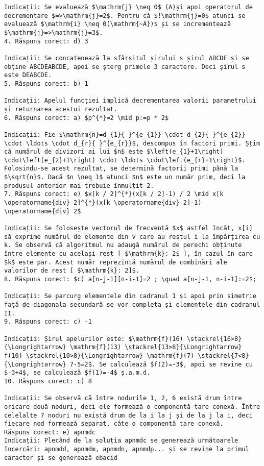 \begin{verbatim}
Indicații: Se evaluează $\mathrm{j} \neq 0$ (A)și apoi operatorul de decrementare $=>\mathrm{j}=2$. Pentru că $!\mathrm{j}=0$ atunci se evaluează $\mathrm{i} \neq 0(\mathrm{~A})$ și se incrementează $\mathrm{j}=>\mathrm{j}=3$.
4. Răspuns corect: d) 3

Indicații: Se concatenează la sfârșitul șirului s șirul ABCDE și se obține ABCDEABCDE, apoi se șterg primele 3 caractere. Deci șirul s este DEABCDE.
5. Răspuns corect: b) 1

Indicații: Apelul funcției implică decrementarea valorii parametrului și returnarea acestui rezultat.
6. Răspuns corect: a) $p^{*}=2 \mid p:=p * 2$

Indicații: Fie $\mathrm{n}=d_{1}{ }^{e_{1}} \cdot d_{2}{ }^{e_{2}} \cdot \ldots \cdot d_{r}{ }^{e_{r}}$, descompus în factori primi. Ș̦tim că numărul de divizori ai lui $n$ este $\left(e_{1}+1\right) \cdot\left(e_{2}+1\right) \cdot \ldots \cdot\left(e_{r}+1\right)$. Folosindu-se acest rezultat, se determină factorii primi până la $\sqrt{n}$. Dacă $n \neq 1$ atunci $n$ este un număr prim, deci la produsul anterior mai trebuie înmulțit 2.
7. Răspuns corect: e) $x[k / 2]^{*}(x[k / 2]-1) / 2 \mid x[k \operatorname{div} 2]^{*}(x[k \operatorname{div} 2]-1) \operatorname{div} 2$

Indicații: Se folosește vectorul de frecvență $x$ astfel încât, x[i] să exprime numărul de elemente din v care au restul i la împărțirea cu k. Se observă că algoritmul nu adaugă numărul de perechi obținute între elemente cu același rest [ $\mathrm{k}: 2$ ], în cazul în care $k$ este par. Acest număr reprezintă numărul de combinări ale valorilor de rest [ $\mathrm{k}: 2]$.
8. Răspuns corect: $c) a[n-j-1][n-i-1]=2 ; \quad a[n-j-1, n-i-1]:=2$;

Indicații: Se parcurg elementele din cadranul 1 și apoi prin simetrie față de diagonala secundară se vor completa și elementele din cadranul II.
9. Răspuns corect: c) -1

Indicații: Șirul apelurilor este: $\mathrm{f}(16) \stackrel{16>8}{\Longrightarrow} \mathrm{f}(13) \stackrel{13>8}{\Longrightarrow} f(10) \stackrel{10>8}{\Longrightarrow} \mathrm{f}(7) \stackrel{7<8}{\Longrightarrow} 7-5=2$. Se calculează $f(2)=-3$, apoi se revine cu $-3+4$, se calculează $f(1)=-4$ ș.a.m.d.
10. Răspuns corect: c) 8

Indicații: Se observă că între nodurile 1, 2, 6 există drum între oricare două noduri, deci ele formează o componentă tare conexă. Între celelalte 7 noduri nu există drum de la i la j și de la j la i, deci fiecare nod formează separat, câte o componentă tare conexă.
Răspuns corect: e) apnmdc
Indicații: Plecând de la soluția apnmdc se generează următoarele încercări: apnmdd, apnmdm, apnmdn, apnmdp... și se revine la primul caracter și se generează ebacid


\end{verbatim}
